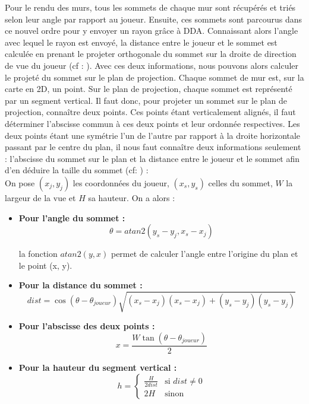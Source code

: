 \documentclass[11pt]{article}
\begin{document}
Pour le rendu des murs, tous les sommets de chaque mur sont récupérés et triés selon leur angle par rapport au joueur.
Ensuite, ces sommets sont parcourus dans ce nouvel ordre pour y envoyer un rayon grâce à DDA. Connaissant alors l'angle
avec lequel le rayon est envoyé, la distance entre le joueur et le sommet est calculée en prenant le projeter orthogonale
du sommet sur la droite de direction de vue du joueur (cf : ). Avec ces deux informations, nous pouvons alors calculer le projeté
du sommet sur le plan de projection. Chaque sommet de mur est, sur la carte en 2D, un point. Sur le plan de projection, 
chaque sommet est représenté par un segment vertical. Il faut donc, pour projeter un sommet sur le plan de projection, connaître
deux points. Ces points étant verticalement alignés, il faut déterminer l'abscisse commun à ces deux points et leur ordonnée 
respectives. Les deux points étant une symétrie l'un de l'autre par rapport à la droite horizontale passant par le centre du plan,
il nous faut connaître deux informations seulement : l'abscisse du sommet sur le plan et la distance entre le joueur et le sommet
afin d'en déduire la taille du sommet (cf: ) : \\

On pose $(x_j, y_j)$ les coordonnées du joueur,  $(x_s, y_s)$ celles du sommet, $W$ la largeur de la
vue et $H$ sa hauteur. On a alors : \\
\begin{itemize}
	\item[] \textbf{Pour l'angle du sommet : } \\
	\[
		\theta = atan2(y_s - y_j, x_s - x_j)
	\]

	la fonction $atan2(y, x)$ permet de calculer l'angle entre l'origine du plan et le point (x, y).

	\item[] \textbf{Pour la distance du sommet : } \\
	\[
		dist = \cos(\theta - \theta_{joueur})\sqrt{(x_s - x_j)(x_s - x_j) + (y_s - y_j)(y_s - y_j)}
	\]
	
	\item[] \textbf{Pour l'abscisse des deux points : } \\
	\[
		x = \frac{W\tan(\theta -  \theta_{joueur})}{2}
	\]

	\item[] \textbf{Pour la hauteur du segment vertical : } \\ 
	\[
		h = 
		\begin{cases}
			\frac{H}{2dist} & \text{si } dist \neq 0 \\
			2H & \text{sinon }
		\end{cases}
	\]
\end{itemize}
\end{document}
